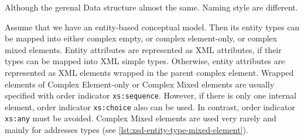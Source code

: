 Although the gerenal 
Data structure almost the same.
Naming style are different.



Assume that we have an entity-based conceptual model.
Then its entity types can be mapped into either complex empty, or complex element-only, or complex mixed elements.
Entity attributes are represented as XML attributes, if their types can be mapped into XML simple types.
Otherwise, entity attributes are represented as XML elements wrapped in the parent complex element.
Wrapped elements of Complex Element-only or Complex Mixed elements are usually specified with order indicator \texttt{xs:sequence}.
However, if there is only one internal element, order indicator \texttt{xs:choice} also can be used.
In contrast, order indicator \texttt{xs:any} must be avoided.
Complex Mixed elements are used very rarely and mainly for addresses types (see \autoref{lst:xsd-entity-type-mixed-element}).

